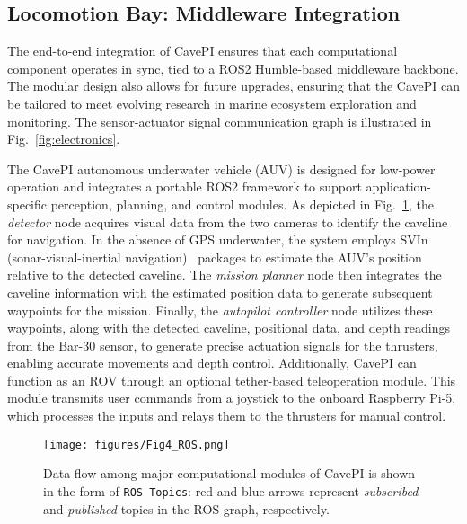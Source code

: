 \subsection{Locomotion Bay: Middleware Integration}
\vspace{-1 mm}
The end-to-end integration of CavePI ensures that each computational component operates in sync, tied to a ROS2 Humble-based middleware backbone. The modular design also allows for future upgrades, ensuring that the CavePI can be tailored to meet evolving research in marine ecosystem exploration and monitoring. The sensor-actuator signal communication graph is illustrated in Fig.~\ref{fig:electronics}.


The CavePI autonomous underwater vehicle (AUV) is designed for low-power operation and integrates a portable ROS2 framework to support application-specific perception, planning, and control modules. As depicted in Fig.~\ref{fig:ROS}, the \textit{detector} node acquires visual data from the two cameras to identify the caveline for navigation. In the absence of GPS underwater, the system employs SVIn (sonar-visual-inertial navigation)~\cite{rahman2022svin2} packages to estimate the AUV’s position relative to the detected caveline. The \textit{mission planner} node then integrates the caveline information with the estimated position data to generate subsequent waypoints for the mission. Finally, the \textit{autopilot controller} node utilizes these waypoints, along with the detected caveline, positional data, and depth readings from the Bar-30 sensor, to generate precise actuation signals for the thrusters, enabling accurate movements and depth control. Additionally, CavePI can function as an ROV through an optional tether-based teleoperation module. This module transmits user commands from a joystick to the onboard Raspberry Pi-5, which processes the inputs and relays them to the thrusters for manual control.

\begin{figure}[t]
    \centering
    \texttt{[image: figures/Fig4\_ROS.png]}%
    \vspace{-1mm}
    \caption{Data flow among major computational modules of CavePI is shown in the form of \texttt{ROS Topics}: red and blue arrows represent \textit{subscribed} and \textit{published} topics in the ROS graph, respectively.}
    \label{fig:ROS}
    \vspace{-4mm}
\end{figure}


